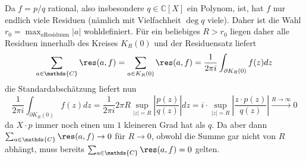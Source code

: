 \documentclass[a4paper]{article}
\begin{document}
Da $f = p/q$ rational, also insbesondere $q \in \mathds{C}[X]$ ein Polynom, ist, hat $f$ nur endlich viele Residuen (nämlich mit Vielfachheit $\deg q$ viele).
Daher ist die Wahl $r_0 = \max_{a \text{Residuum}} |a|$ wohldefiniert.
Für ein beliebiges $R > r_0$ liegen daher alle Residuen innerhalb des Kreises $K_R(0)$ und der Residuensatz liefert
\begin{equation*}
    \sum_{a \in \mathds{C}} \res(a, f) = \sum_{a \in K_R(0)} \res(a, f) = \frac{1}{2 \pi i} \int_{\partial K_R(0)} f(z) dz
\end{equation*}
die Standardabschätzung liefert nun
\begin{equation*}
    \frac{1}{2 \pi i}\int_{\partial K_R(0)} f(z) dz = \frac{1}{2 \pi i} 2 \pi R \sup_{|z| = R}\left| \frac{p(z)}{q(z)} \right| dz = i \cdot \sup_{|z| = R} \left| \frac{z \cdot p(z)}{q(z)} \right| \xrightarrow{R \to \infty} 0
\end{equation*}
da $X \cdot p$ immer noch einen um $1$ kleineren Grad hat als $q$.
Da aber dann $\sum_{a \in \mathds{C}} \res(a, f) \to 0$ für $R \to 0$, obwohl die Summe gar nicht von $R$ abhängt, muss bereits $\sum_{a \in \mathds{C}} \res(a, f) = 0$ gelten.
\end{document}
